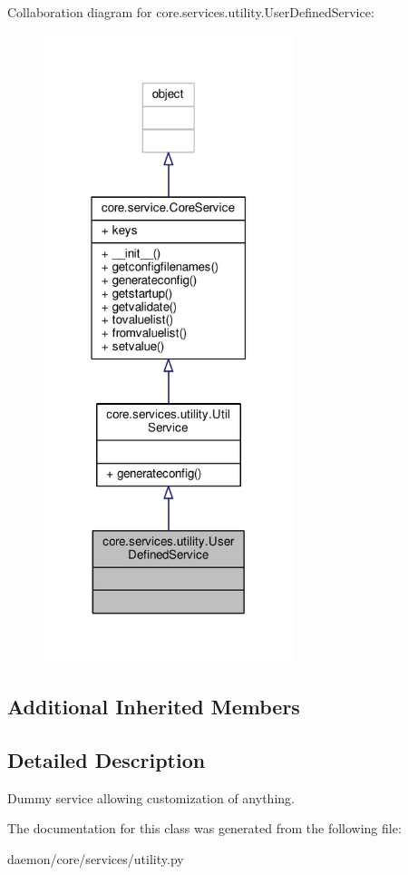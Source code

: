 Collaboration diagram for core.\+services.\+utility.\+User\+Defined\+Service\+:
\nopagebreak
\begin{figure}[H]
\begin{center}
\leavevmode
\includegraphics[width=207pt]{classcore_1_1services_1_1utility_1_1_user_defined_service__coll__graph}
\end{center}
\end{figure}
\subsection*{Additional Inherited Members}


\subsection{Detailed Description}
\begin{DoxyVerb}Dummy service allowing customization of anything.
\end{DoxyVerb}
 

The documentation for this class was generated from the following file\+:\begin{DoxyCompactItemize}
\item 
daemon/core/services/utility.\+py\end{DoxyCompactItemize}
